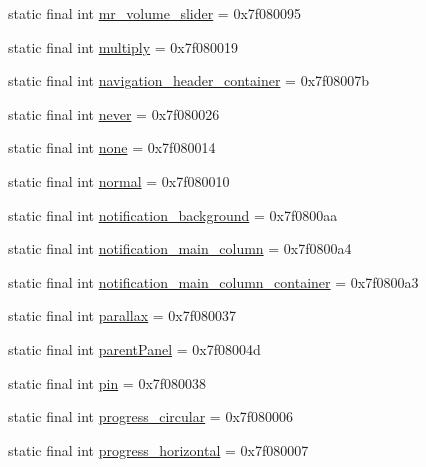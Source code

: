 \begin{CompactItemize}
static final int \hyperlink{classandroid_1_1support_1_1v7_1_1cardview_1_1_r_1_1id_9760a85f1a254dfd2e7da5c99539bc76}{mr\_\-volume\_\-slider} = 0x7f080095
\item 
static final int \hyperlink{classandroid_1_1support_1_1v7_1_1cardview_1_1_r_1_1id_cd25e439fa266c3b09d8f35688ad5177}{multiply} = 0x7f080019
\item 
static final int \hyperlink{classandroid_1_1support_1_1v7_1_1cardview_1_1_r_1_1id_71cf5f6c848a613bb783905c8a0db3e0}{navigation\_\-header\_\-container} = 0x7f08007b
\item 
static final int \hyperlink{classandroid_1_1support_1_1v7_1_1cardview_1_1_r_1_1id_5b2cd1cd2c17c968d3434654fad7d904}{never} = 0x7f080026
\item 
static final int \hyperlink{classandroid_1_1support_1_1v7_1_1cardview_1_1_r_1_1id_c0a068be26b9e8f2eb2afa2b6df72a0b}{none} = 0x7f080014
\item 
static final int \hyperlink{classandroid_1_1support_1_1v7_1_1cardview_1_1_r_1_1id_d8b0faa4f60ab44db8f47ee4c0db2f53}{normal} = 0x7f080010
\item 
static final int \hyperlink{classandroid_1_1support_1_1v7_1_1cardview_1_1_r_1_1id_de4f98f43270877527a0c66a2d2cdf48}{notification\_\-background} = 0x7f0800aa
\item 
static final int \hyperlink{classandroid_1_1support_1_1v7_1_1cardview_1_1_r_1_1id_7bfe2c425e85d4d107383ea2965a1328}{notification\_\-main\_\-column} = 0x7f0800a4
\item 
static final int \hyperlink{classandroid_1_1support_1_1v7_1_1cardview_1_1_r_1_1id_1114a8bfb6edada9c59d62159b059bb0}{notification\_\-main\_\-column\_\-container} = 0x7f0800a3
\item 
static final int \hyperlink{classandroid_1_1support_1_1v7_1_1cardview_1_1_r_1_1id_ebb89e490892d7534c936bc653cbf49e}{parallax} = 0x7f080037
\item 
static final int \hyperlink{classandroid_1_1support_1_1v7_1_1cardview_1_1_r_1_1id_c26ad92c446d1434c2dc17dc82c661f8}{parentPanel} = 0x7f08004d
\item 
static final int \hyperlink{classandroid_1_1support_1_1v7_1_1cardview_1_1_r_1_1id_3e7120260fd32973e1e96914d736b472}{pin} = 0x7f080038
\item 
static final int \hyperlink{classandroid_1_1support_1_1v7_1_1cardview_1_1_r_1_1id_9b9c5b6fd94735919f5ac8396676d7f2}{progress\_\-circular} = 0x7f080006
\item 
static final int \hyperlink{classandroid_1_1support_1_1v7_1_1cardview_1_1_r_1_1id_2bb83e4520f1c1ee005e59239d17da26}{progress\_\-horizontal} = 0x7f080007

\end{CompactItemize}
